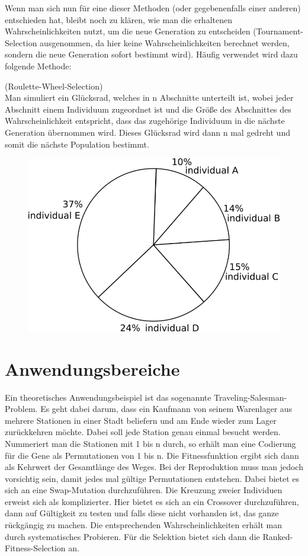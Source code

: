 Wenn man sich nun für eine dieser Methoden (oder gegebenenfalls einer anderen) entschieden hat, bleibt noch zu klären, wie man die erhaltenen Wahrscheinlichkeiten nutzt, um die neue Generation zu entscheiden (Tournament-Selection ausgenommen, da hier keine Wahrscheinlichkeiten berechnet werden, sondern die neue Generation sofort bestimmt wird). Häufig verwendet wird dazu folgende Methode:
\begin{algo}(Roulette-Wheel-Selection)\\
	Man simuliert ein Glücksrad, welches in n Abschnitte unterteilt ist, wobei jeder Abschnitt einem Individuum zugeordnet ist und die Größe des Abschnittes des Wahrscheinlichkeit entspricht, dass das zugehörige Individuum in die nächste Generation übernommen wird. Dieses Glücksrad wird dann n mal gedreht und somit die nächste Population bestimmt.
	\begin{figure}[h]
		\includegraphics[width=0.7\linewidth]{chapters/genetic/rouletteWheel.png}
	\end{figure}
	
\end{algo}
\section{Anwendungsbereiche}
Ein theoretisches Anwendungsbeispiel ist das sogenannte Traveling-Salesman-Problem. Es geht dabei darum, dass ein Kaufmann von seinem Warenlager aus mehrere Stationen in einer Stadt beliefern und am Ende wieder zum Lager zurückkehren möchte. Dabei soll jede Station genau einmal besucht werden. Nummeriert man die Stationen mit 1 bis n durch, so erhält man eine Codierung für die Gene als Permutationen von 1 bis n. Die Fitnessfunktion ergibt sich dann als Kehrwert der Gesamtlänge des Weges. Bei der Reproduktion muss man jedoch vorsichtig sein, damit jedes mal gültige Permutationen entstehen. Dabei bietet es sich an eine Swap-Mutation durchzuführen. Die Kreuzung zweier Individuen erweist sich als komplizierter. Hier bietet es sich an ein Crossover durchzuführen, dann auf Gültigkeit zu testen und falls diese nicht vorhanden ist, das ganze rückgängig zu machen. Die entsprechenden Wahrscheinlichkeiten erhält man durch systematisches Probieren. Für die Selektion bietet sich dann die Ranked-Fitness-Selection an.

